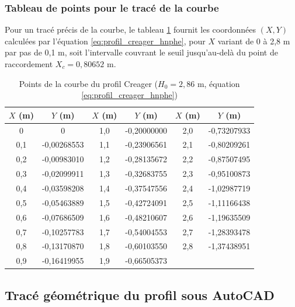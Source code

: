 \subsubsection{Tableau de points pour le tracé de la courbe}
\label{subsubsec:points_profil_usace}

Pour un tracé précis de la courbe, le tableau \ref{tab:points_profil_creager_hnphe} fournit les coordonnées $(X,Y)$ calculées par l'équation \ref{eq:profil_creager_hnphe}, pour $X$ variant de 0 à 2,8 m par pas de 0,1 m, soit l'intervalle couvrant le seuil jusqu'au-delà du point de raccordement $X_c=0{,}80652$ m.

\begin{table}[H]
    \centering
    \caption{Points de la courbe du profil Creager ($H_0=2{,}86$ m, équation \ref{eq:profil_creager_hnphe})}
    \label{tab:points_profil_creager_hnphe}
    \begin{tabular}{|c|c||c|c||c|c|}
        \hline
        \textbf{$X$ (m)} & \textbf{$Y$ (m)} & \textbf{$X$ (m)} & \textbf{$Y$ (m)} & \textbf{$X$ (m)} & \textbf{$Y$ (m)} \\
        \hline
        0 & 0 & 1,0 & -0,20000000 & 2,0 & -0,73207933 \\
        \hline
        0,1 & -0,00268553 & 1,1 & -0,23906561 & 2,1 & -0,80209261 \\
        \hline
        0,2 & -0,00983010 & 1,2 & -0,28135672 & 2,2 & -0,87507495 \\
        \hline
        0,3 & -0,02099911 & 1,3 & -0,32683755 & 2,3 & -0,95100873 \\
        \hline
        0,4 & -0,03598208 & 1,4 & -0,37547556 & 2,4 & -1,02987719 \\
        \hline
        0,5 & -0,05463889 & 1,5 & -0,42724091 & 2,5 & -1,11166438 \\
        \hline
        0,6 & -0,07686509 & 1,6 & -0,48210607 & 2,6 & -1,19635509 \\
        \hline
        0,7 & -0,10257783 & 1,7 & -0,54004553 & 2,7 & -1,28393478 \\
        \hline
        0,8 & -0,13170870 & 1,8 & -0,60103550 & 2,8 & -1,37438951 \\
        \hline
        0,9 & -0,16419955 & 1,9 & -0,66505373 & & \\
        \hline
    \end{tabular}
\end{table}

\subsection{Tracé géométrique du profil sous AutoCAD}
\label{subsec:trace_autocad}

